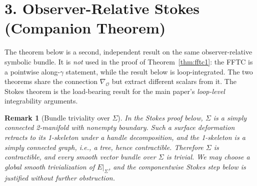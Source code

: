 \documentclass[11pt]{article}
\newtheorem{remark}{Remark}
\newcommand{\Obs}{\mathcal{O}}
\newcommand{\nablaO}{\nabla_{\Obs}}
\newcommand{\EE}{E}
\begin{document}
\section*{3. Observer-Relative Stokes (Companion Theorem)}

The theorem below is a second, independent result on the same
observer-relative symbolic bundle. It is \emph{not} used in the proof
of Theorem~\ref{thm:fftc1}: the FFTC is a pointwise along-$\gamma$
statement, while the result below is loop-integrated. The two
theorems share the connection $\nablaO$ but extract different scalars
from it. The Stokes theorem is the load-bearing result for the main
paper's \emph{loop-level} integrability arguments.

\begin{remark}[Bundle triviality over $\Sigma$]
\label{rem:triv}
In the Stokes proof below, $\Sigma$ is a simply connected 2-manifold
with nonempty boundary. Such a surface deformation retracts to its
1-skeleton under a handle decomposition, and the 1-skeleton is a
simply connected graph, i.e., a tree, hence contractible. Therefore
$\Sigma$ is contractible, and every smooth vector bundle over
$\Sigma$ is trivial. We may choose a global smooth trivialization of
$\EE|_\Sigma$, and the componentwise Stokes step below is justified
without further obstruction.
\end{remark}
\end{document}
